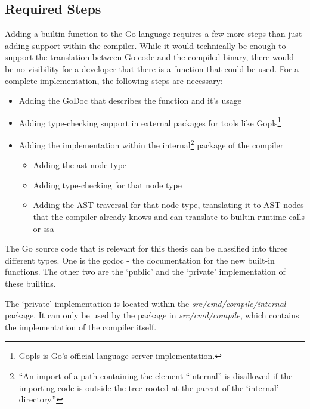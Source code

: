 \subsection{Required Steps}

Adding a builtin function to the Go language requires a few more steps than just
adding support within the compiler. While it would technically be enough to
support the translation between Go code and the compiled binary, there would be
no visibility for a developer that there is a function that could be used.
For a complete implementation, the following steps are necessary:
\begin{itemize}
    \item Adding the GoDoc\autocite{godoc} that describes the function and it's usage
    \item Adding type-checking support in external packages for tools like
        Gopls\footnote{Gopls is Go's official language server implementation\autocite{gopls}.}
    \item Adding the implementation within the internal\footnote{
            ``An import of
            a path containing the element “internal” is disallowed if the
            importing code is outside the tree rooted at the parent of the
            `internal' directory.''\autocite{internal-packages}
        }
        package of the compiler
        \begin{itemize}
            \item Adding the \gls{ast} node type
            \item Adding type-checking for that node type
            \item Adding the AST traversal for that node type, translating it
                to AST nodes that the compiler already knows and can translate
                to builtin runtime-calls or \gls{ssa}
        \end{itemize}
\end{itemize}

The Go source code that is relevant for this thesis can be classified into three different
types. One is the godoc - the documentation for the new built-in functions. The
other two are the `public' and the `private' implementation of these builtins.

The `private' implementation is located within the
\textit{src/cmd/compile/internal} package\autocite{internal-packages}. It can only
be used by the package in \textit{src/cmd/compile}, which contains the
implementation of the compiler itself.


